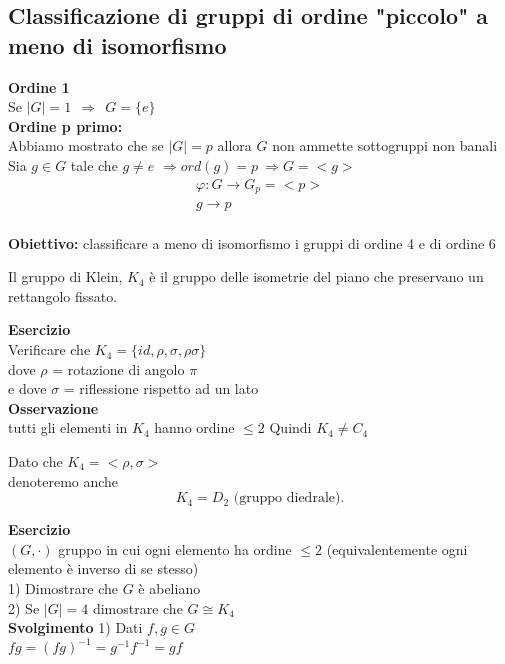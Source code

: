 \documentclass[12px]{article}
\begin{document}
		\subsection{Classificazione di gruppi di ordine "piccolo" a meno di isomorfismo}
		\textbf{Ordine 1}\\
		Se $|G| = 1 \ \ \Rightarrow  \ \ G = \{e\}$\\
		\textbf{Ordine p primo:}\\
		Abbiamo mostrato che se $|G|=p$ allora  $G$ non ammette sottogruppi non banali\\
		Sia $g\in G$ tale che $g\neq e$
		$ \Rightarrow ord(g) = p \ \Rightarrow G = <g>$ \\
		\begin{gather*}
			\varphi: G \rightarrow G_p = <p>\\
			g \rightarrow p
		\end{gather*}\\
		\textbf{Obiettivo:} classificare a meno di isomorfismo i gruppi di ordine 4 e di ordine 6\\
		\newpage
		\begin{defi}[Klein,1884]
			Il gruppo di Klein, $K_4$ è il gruppo delle isometrie del piano che preservano un rettangolo fissato.
		\end{defi}
		\textbf{Esercizio}\\
		Verificare che $K_4 = \{id, \rho,\sigma, \rho\sigma\}$\\
		dove $\rho$ = rotazione di angolo $\pi$\\
		e dove  $\sigma$ = riflessione rispetto ad un lato\\
		\textbf{Osservazione}\\ tutti gli elementi in $K_4$ hanno ordine $\leq 2$ Quindi  $K_4\neq C_4$\\
		\begin{nota}
			Dato che $K_4 = <\rho,\sigma>$\\
			denoteremo anche
			\[
				K_4 = D_2 \text{ (gruppo diedrale)}
			.\] 
		\end{nota}
		\textbf{Esercizio}\\
		$(G,\cdot)$ gruppo in cui ogni elemento ha ordine $\leq 2$ (equivalentemente ogni elemento è inverso di se stesso)\\
		1) Dimostrare che $G$ è abeliano\\
		2) Se $|G| = 4$ dimostrare che  $G \cong K_4$\\
		\textbf{Svolgimento}
		1) Dati $f,g\in G$\\
		$fg = (fg)^{-1} = g^{-1}f^{-1} = gf$\\
\end{document}

